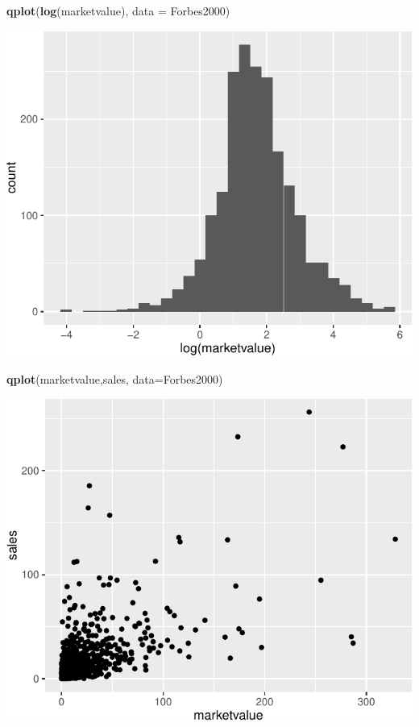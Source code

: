 \documentclass[]{article}
\newenvironment{Shaded}{\begin{snugshade}}{\end{snugshade}}
\newcommand{\KeywordTok}[1]{\textcolor[rgb]{0.13,0.29,0.53}{\textbf{{#1}}}}
\newcommand{\DataTypeTok}[1]{\textcolor[rgb]{0.13,0.29,0.53}{{#1}}}
\newcommand{\NormalTok}[1]{{#1}}
\numberwithin{equation}{section}
\begin{document}
\begin{Shaded}
\begin{Highlighting}[]
\KeywordTok{qplot}\NormalTok{(}\KeywordTok{log}\NormalTok{(marketvalue),  }\DataTypeTok{data =} \NormalTok{Forbes2000)}
\end{Highlighting}
\end{Shaded}

\includegraphics{index_files/figure-latex/unnamed-chunk-254-2.pdf}

\begin{Shaded}
\begin{Highlighting}[]
\KeywordTok{qplot}\NormalTok{(marketvalue,sales, }\DataTypeTok{data=}\NormalTok{Forbes2000)}
\end{Highlighting}
\end{Shaded}

\includegraphics{index_files/figure-latex/unnamed-chunk-254-3.pdf}
\end{document}
